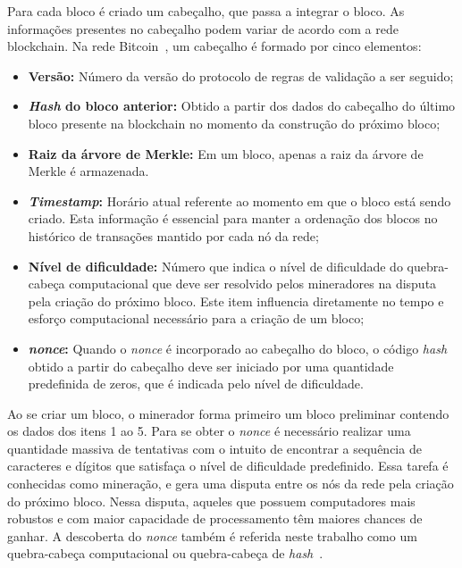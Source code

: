 Para cada bloco é criado um cabeçalho, que passa a integrar o bloco. As informações presentes no cabeçalho podem variar de acordo com a rede blockchain. Na rede Bitcoin~\cite{overview-bitcoin2008nakamoto}, um cabeçalho é formado por cinco elementos:  
\begin{itemize}
    \item \textbf{Versão:} Número da versão do protocolo de regras de validação a ser seguido; 
    \item \textbf{\textit{Hash} do bloco anterior:} Obtido a partir dos dados do cabeçalho do último bloco presente na blockchain no momento da construção do próximo bloco;
    \item \textbf{Raiz da árvore de Merkle:} Em um bloco, apenas a raiz da árvore de Merkle é armazenada. 
    \item \textbf{\textit{Timestamp}:} Horário atual referente ao momento em que o bloco está sendo criado. Esta informação é essencial para manter a ordenação dos blocos no histórico de transações mantido por cada nó da rede;
    \item \textbf{Nível de dificuldade:} Número que indica o nível de dificuldade do quebra-cabeça computacional que deve ser resolvido pelos mineradores na disputa pela criação do próximo bloco. Este item influencia diretamente no tempo e esforço computacional necessário para a criação de um bloco;
    \item \textbf{\textit{nonce}:} Quando o \textit{nonce} é incorporado ao cabeçalho do bloco, o código \textit{hash} obtido a partir do cabeçalho deve ser iniciado por uma quantidade predefinida de zeros, que é indicada pelo nível de dificuldade. 
\end{itemize}


Ao se criar um bloco, o minerador forma primeiro um bloco preliminar contendo os dados dos itens 1 ao 5. Para se obter o \textit{nonce} é necessário realizar uma quantidade massiva de tentativas com o intuito de encontrar a sequência de caracteres e dígitos que satisfaça o nível de dificuldade predefinido. Essa tarefa é conhecidas como mineração, e gera uma disputa entre os nós da rede pela criação do próximo bloco. Nessa disputa, aqueles que possuem computadores mais robustos e com maior capacidade de processamento têm maiores chances de ganhar. A descoberta do \textit{nonce} também é referida neste trabalho como um quebra-cabeça computacional ou quebra-cabeça de \textit{hash}~\cite{overview-blockchainbasic2018drescher, swan2015blockchain-book}. 

